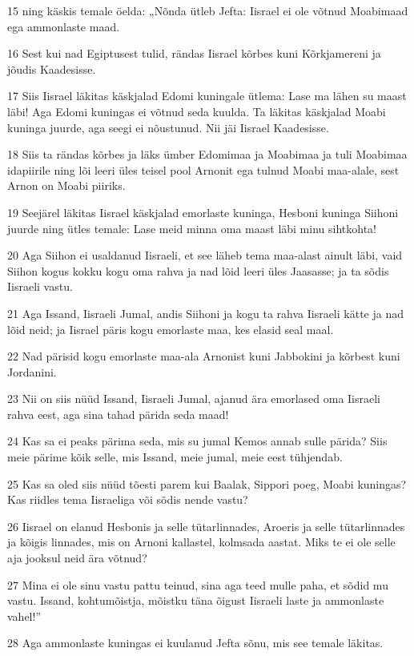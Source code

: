 \par 15 ning käskis temale öelda: „Nõnda ütleb Jefta: Iisrael ei ole võtnud Moabimaad ega ammonlaste maad.
\par 16 Sest kui nad Egiptusest tulid, rändas Iisrael kõrbes kuni Kõrkjamereni ja jõudis Kaadesisse.
\par 17 Siis Iisrael läkitas käskjalad Edomi kuningale ütlema: Lase ma lähen su maast läbi! Aga Edomi kuningas ei võtnud seda kuulda. Ta läkitas käskjalad Moabi kuninga juurde, aga seegi ei nõustunud. Nii jäi Iisrael Kaadesisse.
\par 18 Siis ta rändas kõrbes ja läks ümber Edomimaa ja Moabimaa ja tuli Moabimaa idapiirile ning lõi leeri üles teisel pool Arnonit ega tulnud Moabi maa-alale, sest Arnon on Moabi piiriks.
\par 19 Seejärel läkitas Iisrael käskjalad emorlaste kuninga, Hesboni kuninga Siihoni juurde ning ütles temale: Lase meid minna oma maast läbi minu sihtkohta!
\par 20 Aga Siihon ei usaldanud Iisraeli, et see läheb tema maa-alast ainult läbi, vaid Siihon kogus kokku kogu oma rahva ja nad lõid leeri üles Jaasasse; ja ta sõdis Iisraeli vastu.
\par 21 Aga Issand, Iisraeli Jumal, andis Siihoni ja kogu ta rahva Iisraeli kätte ja nad lõid neid; ja Iisrael päris kogu emorlaste maa, kes elasid seal maal.
\par 22 Nad pärisid kogu emorlaste maa-ala Arnonist kuni Jabbokini ja kõrbest kuni Jordanini.
\par 23 Nii on siis nüüd Issand, Iisraeli Jumal, ajanud ära emorlased oma Iisraeli rahva eest, aga sina tahad pärida seda maad!
\par 24 Kas sa ei peaks pärima seda, mis su jumal Kemos annab sulle pärida? Siis meie pärime kõik selle, mis Issand, meie jumal, meie eest tühjendab.
\par 25 Kas sa oled siis nüüd tõesti parem kui Baalak, Sippori poeg, Moabi kuningas? Kas riidles tema Iisraeliga või sõdis nende vastu?
\par 26 Iisrael on elanud Hesbonis ja selle tütarlinnades, Aroeris ja selle tütarlinnades ja kõigis linnades, mis on Arnoni kallastel, kolmsada aastat. Miks te ei ole selle aja jooksul neid ära võtnud?
\par 27 Mina ei ole sinu vastu pattu teinud, sina aga teed mulle paha, et sõdid mu vastu. Issand, kohtumõistja, mõistku täna õigust Iisraeli laste ja ammonlaste vahel!”
\par 28 Aga ammonlaste kuningas ei kuulanud Jefta sõnu, mis see temale läkitas.
